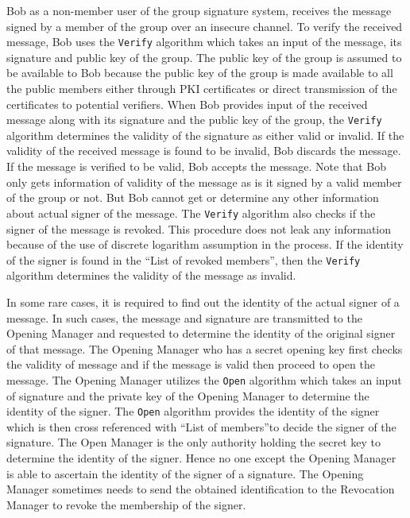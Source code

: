 Bob as a non-member user of the group signature system, receives the message signed by a member of the group over an insecure channel. To verify the received message, Bob uses the \texttt{Verify} algorithm which takes an input of the message, its signature and public key of the group. The public key of the group is assumed to be available to Bob because the public key of the group is made available to all the public members either through PKI certificates or direct transmission of the certificates to potential verifiers. When Bob provides input of the received message along with its signature and the public key of the group, the \texttt{Verify} algorithm determines the validity of the signature as either valid or invalid. If the validity of the received message is found to be invalid, Bob discards the message. If the message is verified to be valid, Bob accepts the message. Note that Bob only gets information of validity of the message as is it signed by a valid member of the group or not. But Bob cannot get or determine any other information about actual signer of the message. The \texttt{Verify} algorithm also checks if the signer of the message is revoked. This procedure does not leak any information because of the use of discrete logarithm assumption in the process. If the identity of the signer is found in the \textquotedblleft List of revoked members\textquotedblright, then the \texttt{Verify} algorithm determines the validity of the message as invalid. 

In some rare cases, it is required to find out the identity of the actual signer of a message. In such cases, the message and signature are transmitted to the Opening Manager and requested to determine the identity of the original signer of that message. The Opening Manager who has a secret opening key first checks the validity of message and if the message is valid then proceed to open the message. The Opening Manager utilizes the \texttt{Open} algorithm which takes an input of signature and the private key of the Opening Manager to determine the identity of the signer. The \texttt{Open} algorithm provides the identity of the signer which is then cross referenced with \textquotedblleft List of members\textquotedblright to decide the signer of the signature. The Open Manager is the only authority holding the secret key to determine the identity of the signer. Hence no one except the Opening Manager is able to ascertain the identity of the signer of a signature. The Opening Manager sometimes needs to send the obtained identification to the Revocation Manager to revoke the membership of the signer.

